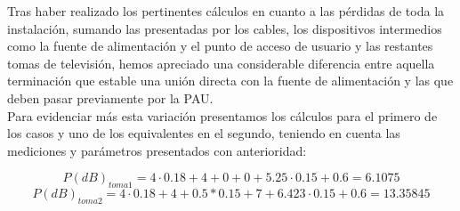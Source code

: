 \documentclass{article}[12 pt]
\begin{document}
		\vskip 3mm

		Tras haber realizado los pertinentes cálculos en cuanto a las pérdidas de toda la instalación, sumando las presentadas por los cables, los dispositivos intermedios como la fuente de alimentación y el punto de acceso de usuario y las restantes tomas de televisión, hemos apreciado una considerable diferencia entre aquella terminación que estable una unión directa con la fuente de alimentación y las que deben pasar previamente por la PAU.\\

		Para evidenciar más esta variación presentamos los cálculos para el primero de los casos y uno de los equivalentes en el segundo, teniendo en cuenta las mediciones y parámetros presentados con anterioridad:

		$$P(dB)_{toma1} = 4 \cdot 0.18 + 4 + 0 + 0 + 5.25 \cdot 0.15 + 0.6 = 6.1075$$
		$$P(dB)_{toma2} = 4 \cdot 0.18 + 4 + 0.5*0.15 + 7 + 6.423 \cdot 0.15 + 0.6 = 13.35845$$
\end{document}
